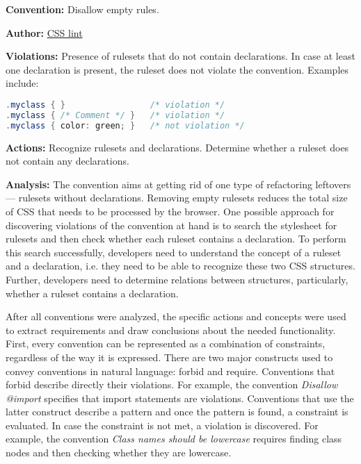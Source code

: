 \bigskip
\begin{boxedminipage}{.95\textwidth}
\begin{description}
\item\textbf{Convention:} Disallow empty rules.
\item\textbf{Author:} \href{https://github.com/CSSLint/csslint/wiki/Disallow-empty-rules}{CSS lint}
\item\textbf{Violations:} Presence of rulesets that do not contain declarations. In case at least one declaration is present, the ruleset does not violate the convention. Examples include:
\begin{lstlisting}[style=mono,language=Java]
.myclass { }                 /* violation */
.myclass { /* Comment */ }   /* violation */
.myclass { color: green; }   /* not violation */
\end{lstlisting}
\item\textbf{Actions:} Recognize rulesets and declarations. Determine whether a ruleset does not contain any declarations.
\item\textbf{Analysis:} The convention aims at getting rid of one type of refactoring leftovers ---
rulesets without declarations. Removing empty rulesets reduces the total size of CSS that
needs to be processed by the browser. One possible approach for discovering violations of the
convention at hand is to search the stylesheet for rulesets and then check whether each ruleset
contains a declaration. To perform this search successfully, developers need to understand the
concept of a ruleset and a declaration, i.e. they need to be able to recognize these two CSS
structures. Further, developers need to determine relations between structures, particularly,
whether a ruleset contains a declaration.
\end{description}
\end{boxedminipage}
\bigskip

After all conventions were analyzed, the specific actions and concepts were
used to extract requirements and draw conclusions about the needed
functionality. First, every convention can be represented as a combination of
constraints, regardless of the way it is expressed. There are two major
constructs used to convey conventions in natural language: forbid and require.
Conventions that forbid describe directly their violations. For example, the
convention \textit{Disallow @import} specifies that import statements are
violations. Conventions that use the latter construct describe a pattern and
once the pattern is found, a constraint is evaluated. In case the constraint
is not met, a violation is discovered. For example, the convention
\textit{Class names should be lowercase} requires finding class nodes and then
checking whether they are lowercase.

